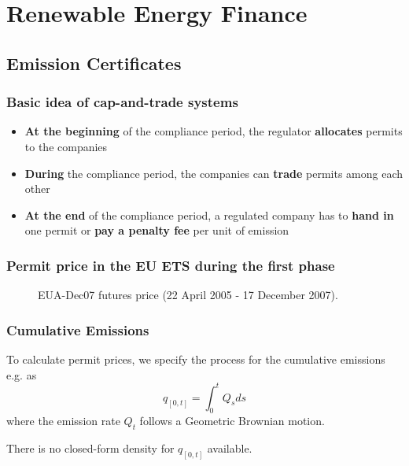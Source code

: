\section{Renewable Energy Finance}
\subsection{Emission Certificates}
\begin{frame}
  \frametitle{Basic idea of cap-and-trade systems}
  \begin{itemize}
  \item<1-> \textbf{At the beginning} of the compliance period, the regulator \textbf{allocates} permits to the companies
  \item<2-> \textbf{During} the compliance period, the companies can \textbf{trade} permits among each other
  \item<3-> \textbf{At the end} of the compliance period, a regulated company has to \textbf{hand in} one permit or \textbf{pay a penalty fee} per unit of emission
  \end{itemize}
\end{frame}

\begin{frame}
  \frametitle{Permit price in the EU ETS during the first phase}
\begin{center}
\begin{figure}[h!]
\centering
{}
\caption{EUA-Dec07 futures price (22 April 2005 - 17 December 2007).}
\label{fig:plotCar00-Data}
\end{figure}
\end{center}
\end{frame}


\begin{frame}
  \frametitle{Cumulative Emissions}
    To calculate permit prices, we specify the process for the cumulative emissions e.g. as     $$
      q_{[0,t]} = \int_0^t Q_s ds
    $$
    where the emission rate $Q_t$ follows a Geometric Brownian motion.


  There is no closed-form density for $q_{[0,t]}$ available.

\end{frame}

